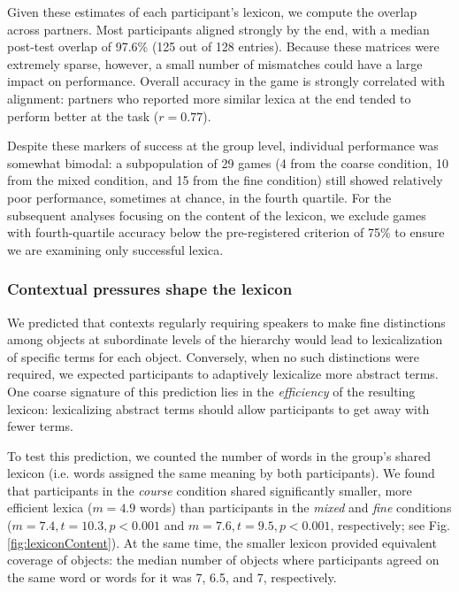 \documentclass[10pt,letterpaper]{article}
\newcommand{\ndg}[1]{\textcolor{Green}{[ndg: #1]}}
\begin{document}
Given these estimates of each participant's lexicon, we compute the overlap across partners. Most participants aligned strongly by the end, with a median post-test overlap of 97.6\% (125 out of 128 entries). Because these matrices were extremely sparse, however, a small number of mismatches could have a large impact on performance. Overall accuracy in the game is strongly correlated with alignment: partners who reported more similar lexica at the end tended to perform better at the task ($r = 0.77$).  

Despite these markers of success at the group level, individual performance was somewhat bimodal: a subpopulation of 29 games (4 from the coarse condition, 10 from the mixed condition, and 15 from the fine condition) still showed relatively poor performance, sometimes at chance, in the fourth quartile. For the subsequent analyses focusing on the content of the lexicon, we exclude games with fourth-quartile accuracy below the pre-registered criterion of 75\% to ensure we are examining only successful lexica.

\subsubsection{Contextual pressures shape the lexicon}

We predicted that contexts regularly requiring speakers to make fine distinctions among objects at subordinate levels of the hierarchy would lead to lexicalization of specific terms for each object. Conversely, when no such distinctions were required, we expected participants to adaptively lexicalize more abstract terms. One coarse signature of this prediction lies in the \emph{efficiency} of the resulting lexicon: lexicalizing abstract terms should allow participants to get away with fewer terms.

To test this prediction, we counted the number of words in the group's shared lexicon (i.e. words assigned the same meaning by both participants). We found that participants in the \emph{course} condition shared significantly smaller, more efficient lexica ($m = 4.9$ words) than participants in the \emph{mixed} and \emph{fine} conditions ($m = 7.4, t = 10.3, p <0.001$ and $m = 7.6, t = 9.5, p < 0.001$, respectively; see Fig. \ref{fig:lexiconContent}). At the same time, the smaller lexicon provided equivalent coverage of objects: the median number of objects where participants agreed on the same word or words for it was 7, 6.5, and 7, respectively.
\end{document}
